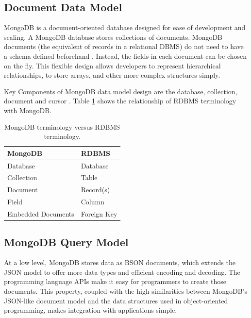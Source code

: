 \subsection{Document Data Model}
MongoDB is a document-oriented database designed for ease of 
development and scaling. A MongoDB database stores collections of 
documents. MongoDB documents (the equivalent of records in a relational DBMS) do not 
need to have a schema defined beforehand \cite{chandra2015base, mongodb_2019}. Instead, the fields in each document can be chosen on the fly. 
This flexible design allows developers to represent hierarchical relationships, to store 
arrays, and other more complex structures simply.


Key Components of MongoDB data model design are the database, collection, document and cursor \cite{banker2011mongodb}. Table \ref{table:terms} shows the relationship of RDBMS terminology with MongoDB. 

\begin{table}[htb]
    \caption{MongoDB terminology versus RDBMS terminology.}
    \label{table:terms}
    \begin{tabular}{ll}
        \toprule
        MongoDB    &    RDBMS\\
        \midrule
        Database    &      Database\\
        Collection   &      Table\\
        Document      &     Record(s)\\
        Field          &      Column\\
        Embedded Documents &  Foreign Key\\
        \bottomrule
    \end{tabular}
\end{table}

\subsection{MongoDB Query Model}
At a low level, MongoDB stores data as BSON documents, which 
extends the JSON model to offer more data types and efficient 
encoding and decoding. The programming language APIs make it 
easy for programmers to create those documents. This property, 
coupled with the high similarities between MongoDB's JSON-like
document model and the data structures used in object-oriented 
programming, makes integration with applications simple. 


